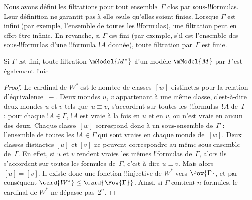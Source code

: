 \documentclass[../../../include/open-logic-section]{subfiles}
\begin{document}


Nous avons défini les filtrations pour tout ensemble~$\Gamma$ clos par
sous-!!{formula}s. Leur définition ne garantit pas à elle seule
qu'elles soient finies. Lorsque $\Gamma$ est infini (par exemple,
l'ensemble de toutes les !!{formula}s), une filtration peut en effet
être infinie. En revanche, si $\Gamma$ est fini (par exemple, s'il
est l'ensemble des sous-!!{formula}s d'une !!{formula}~$!A$ donnée),
toute filtration par~$\Gamma$ est finie.

\begin{prop}
  Si $\Gamma$ est fini, toute filtration $\mModel{M^*}$ d'un modèle
  $\mModel{M}$ par $\Gamma$ est également finie.
\end{prop}

\begin{proof}
  Le cardinal de $W^*$ est le nombre de classes~$[w]$ distinctes
  pour la relation d'équivalence~$\equiv$. Deux mondes $u$, $v$
  appartenant à une même classe, c'est-à-dire deux mondes $u$ et $v$
  tels que~$u \equiv v$, s'accordent sur toutes les !!{formula}s~$!A$
  de~$\Gamma$ : pour chaque $!A \in \Gamma$, $!A$ est vraie à la fois
  en $u$ et en $v$, ou n'est vraie en aucun des deux. Chaque
  classe~$[w]$ correspond donc à un sous-ensemble de~$\Gamma$ :
  l'ensemble de toutes les $!A \in \Gamma$ qui sont vraies en
  chaque monde de~$[w]$. Deux classes distinctes $[u]$ et $[v]$ ne peuvent
  correspondre au même sous-ensemble de~$\Gamma$. En effet, si
  $u$ et $v$ rendent vraies les mêmes !!{formula}s de~$\Gamma$, alors
  ils s'accordent sur toutes
  les formules de~$\Gamma$, c'est-à-dire $u \equiv v$. Mais alors
  $[u] = [v]$. Il existe donc une fonction !!{injective} de $W^*$
  vers $\Pow{\Gamma}$, et par conséquent
  $\card{W^*} \le \card{\Pow{\Gamma}}$. Ainsi, si $\Gamma$ contient
  $n$ formules, le cardinal de $W^*$ ne dépasse pas~$2^n$.
\end{proof}
\end{document}
